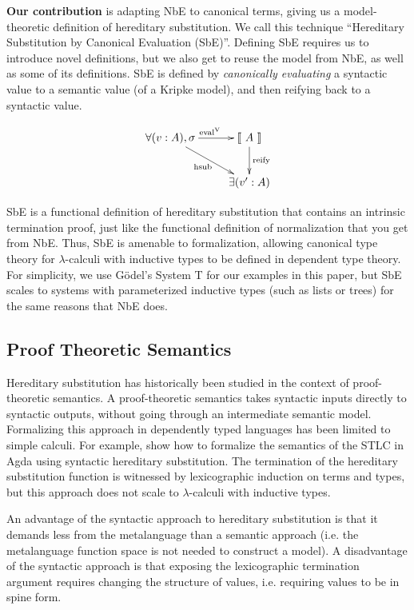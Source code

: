\documentclass{llncs}
\def\cevalv{\fun{eval}^\con{V}}
\newcommand{\ascribe}[2]{(#1 : #2)}
\newcommand{\els}[1]{\llbracket ~ #1 ~ \rrbracket}
\newcommand{\con}[1]{\textmd{#1}}
\newcommand{\fun}[1]{\textmd{#1}}
\begin{document}
\textbf{Our contribution} is adapting NbE to canonical terms, giving us a model-theoretic
definition of hereditary substitution. We call this technique
``Hereditary Substitution by Canonical Evaluation (SbE)''. Defining
SbE requires us to introduce novel definitions, but we also get to
reuse the model from NbE, as well as some of its definitions. SbE is
defined by \textit{canonically evaluating} a syntactic value to a
semantic value (of a Kripke model), and then reifying back to a syntactic value.

\begin{displaymath}
    \xymatrix{
          \forall{\ascribe{v}{A}, \sigma}
          \ar[dr]_{\fun{hsub}}
          \ar[r]^{\cevalv}
        & {\els{A}}
          \ar[d]^{\large{\fun{reify}}}
\\      & \exists{\ascribe{v'}{A}} }
\end{displaymath}

SbE is a functional definition of hereditary substitution that
contains an intrinsic termination proof, just like the functional
definition of normalization that you get from NbE. Thus, SbE is
amenable to formalization, allowing canonical type theory for
$\lambda$-calculi with inductive types to be defined in dependent type
theory. For simplicity, we use G{\"o}del's System T for our examples
in this paper, but SbE scales to systems with parameterized inductive
types (such as lists or trees) for the same reasons that NbE does.

\subsection{Proof Theoretic Semantics}
\label{sec:proof-theoretic}

Hereditary substitution has historically been studied in the context
of proof-theoretic semantics. A proof-theoretic semantics takes
syntactic inputs directly to syntactic outputs, without going through
an intermediate semantic model. Formalizing this approach in
dependently typed languages has been limited to simple calculi.
For example, \cite{TODO} show how to formalize the
semantics of the STLC in Agda using syntactic hereditary substitution.
The termination of the hereditary substitution function is witnessed
by lexicographic induction on terms and types, but this approach does
not scale to $\lambda$-calculi with inductive types.

An advantage of the syntactic approach to hereditary substitution is
that it demands less from the metalanguage than a semantic
approach (i.e. the metalanguage
function space is not needed to construct a model). A disadvantage of
the syntactic approach is that exposing the lexicographic termination
argument requires changing the structure of values, i.e. requiring
values to be in spine form.
\end{document}
